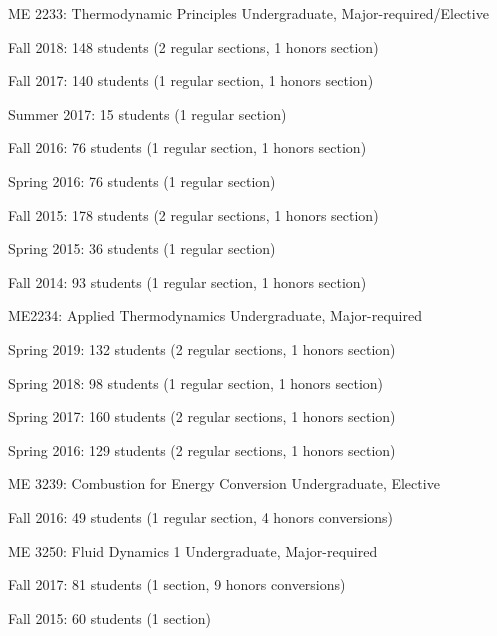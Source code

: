 \begin{outerlist}
\item ME 2233: Thermodynamic Principles \hfill Undergraduate, Major-required/Elective
\begin{innerlist}
    \item Fall 2018: 148 students (2 regular sections, 1 honors section)
    \item Fall 2017: 140 students (1 regular section, 1 honors section)
    \item Summer 2017: 15 students (1 regular section)
    \item Fall 2016: 76 students (1 regular section, 1 honors section)
    \item Spring 2016: 76 students (1 regular section)
    \item Fall 2015: 178 students (2 regular sections, 1 honors section)
    \item Spring 2015: 36 students (1 regular section)
    \item Fall 2014: 93 students (1 regular section, 1 honors section)
\end{innerlist}

\item ME2234: Applied Thermodynamics \hfill Undergraduate, Major-required
\begin{innerlist}
    \item Spring 2019: 132 students (2 regular sections, 1 honors section)
    \item Spring 2018: 98 students (1 regular section, 1 honors section)
    \item Spring 2017: 160 students (2 regular sections, 1 honors section)
    \item Spring 2016: 129 students (2 regular sections, 1 honors section)
\end{innerlist}

\item ME 3239: Combustion for Energy Conversion \hfill Undergraduate, Elective
\begin{innerlist}
    \item Fall 2016: 49 students (1 regular section, 4 honors conversions)
\end{innerlist}

\item ME 3250: Fluid Dynamics 1 \hfill Undergraduate, Major-required
\begin{innerlist}
    \item Fall 2017: 81 students (1 section, 9 honors conversions)
    \item Fall 2015: 60 students (1 section)
\end{innerlist}


\end{outerlist}
